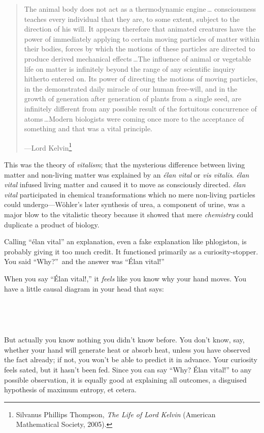 \begin{quote}
{
 The animal body does not act as a thermodynamic engine\,\ldots
consciousness teaches every individual that they are, to some extent,
subject to the direction of his will. It appears therefore that
animated creatures have the power of immediately applying to certain
moving particles of matter within their bodies, forces by which the
motions of these particles are directed to produce derived mechanical
effects\,\ldots The influence of animal or vegetable life on matter is
infinitely beyond the range of any scientific inquiry hitherto entered
on. Its power of directing the motions of moving particles, in the
demonstrated daily miracle of our human free-will, and in the growth of
generation after generation of plants from a single seed, are
infinitely different from any possible result of the fortuitous
concurrence of atoms\,\ldots Modern biologists were coming once more to
the acceptance of something and that was a vital principle.}

{\raggedleft
 {}---Lord Kelvin\footnote{Silvanus Phillips Thompson, \textit{The Life of Lord Kelvin}
(American Mathematical Society, 2005).}
\par}
\end{quote}


{
 This was the theory of \textit{vitalism}; that the mysterious
difference between living matter and non-living matter was explained by
an \textit{élan vital} or \textit{vis vitalis}. \textit{élan vital}
infused living matter and caused it to move as consciously directed.
\textit{élan vital} participated in chemical transformations which no
mere non-living particles could undergo---Wöhler's
later synthesis of urea, a component of urine, was a major blow to the
vitalistic theory because it showed that mere \textit{chemistry} could
duplicate a product of biology.}

{
 Calling ``élan vital'' an
explanation, even a fake explanation like phlogiston, is probably
giving it too much credit. It functioned primarily as a
curiosity-stopper. You said ``Why?''~and the answer was ``Élan vital!''}

{
 When you say ``Élan vital!,''
it \textit{feels} like you know why your hand moves. You have a little
causal diagram in your head that says:}

{
 ~}



{
 ~}

{
 But actually you know nothing you didn't know
before. You don't know, say, whether your hand will
generate heat or absorb heat, unless you have observed the fact
already; if not, you won't be able to predict it in
advance. Your curiosity feels sated, but it hasn't been
fed. Since you can say ``Why? Élan
vital!'' to any possible observation, it is equally
good at explaining all outcomes, a disguised hypothesis of maximum
entropy, et cetera.}

